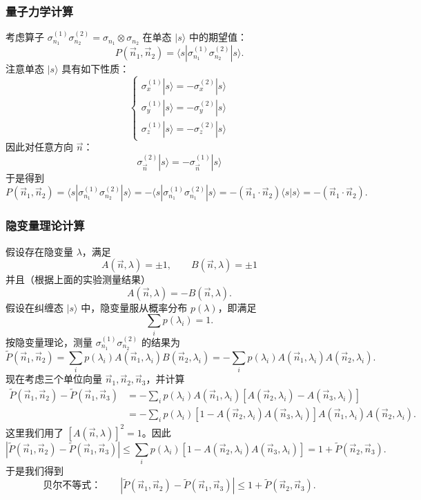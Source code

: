 \subsubsection*{量子力学计算}

考虑算子 \(\sigma_{n_1}^{(1)}\sigma_{n_2}^{(2)}=\sigma_{n_1}\otimes\sigma_{n_2}\) 在单态 \(|s\rangle\) 中的期望值：
\[
  P(\vec n_1,\vec n_2)=\langle s|\sigma_{n_1}^{(1)}\sigma_{n_2}^{(2)}|s\rangle.
\]
注意单态 \(|s\rangle\) 具有如下性质：
\[
  \begin{cases}
    \sigma_x^{(1)}|s\rangle=-\sigma_x^{(2)}|s\rangle\\[2pt]
    \sigma_y^{(1)}|s\rangle=-\sigma_y^{(2)}|s\rangle\\[2pt]
    \sigma_z^{(1)}|s\rangle=-\sigma_z^{(2)}|s\rangle
  \end{cases}
\]
因此对任意方向 \(\vec n\)：
\[
  \sigma_{\vec n}^{(2)}|s\rangle=-\sigma_{\vec n}^{(1)}|s\rangle
\]
于是得到
\[
  P(\vec n_1,\vec n_2)=\langle s|\sigma_{n_1}^{(1)}\sigma_{n_2}^{(2)}|s\rangle
  =-\langle s|\sigma_{n_1}^{(1)}\sigma_{n_1}^{(2)}|s\rangle
  =-(\vec n_1\cdot\vec n_2)\langle s|s\rangle=-(\vec n_1\cdot\vec n_2).
\]

\subsubsection*{隐变量理论计算}

假设存在隐变量 \(\lambda\)，满足
\[
  A(\vec n,\lambda)=\pm1,\qquad B(\vec n,\lambda)=\pm1
\]
并且（根据上面的实验测量结果）
\[
  A(\vec n,\lambda)=-B(\vec n,\lambda).
\]
假设在纠缠态 \(|s\rangle\) 中，隐变量服从概率分布 \(p(\lambda)\)，即满足
\[
  \sum_ip(\lambda_i)=1.
\]
按隐变量理论，测量 \(\sigma_{n_1}^{(1)}\sigma_{n_2}^{(2)}\) 的结果为
\[
  \tilde P(\vec n_1,\vec n_2)
  =\sum_ip(\lambda_i)A(\vec n_1,\lambda_i)B(\vec n_2,\lambda_i)
  =-\sum_ip(\lambda_i)A(\vec n_1,\lambda_i)A(\vec n_2,\lambda_i).
\]
现在考虑三个单位向量 \(\vec n_1,\vec n_2,\vec n_3\)，并计算
\[
  \begin{aligned}
    \tilde P(\vec n_1,\vec n_2)-\tilde P(\vec n_1,\vec n_3)
    &=-\sum_ip(\lambda_i)A(\vec n_1,\lambda_i)
      \left[A(\vec n_2,\lambda_i)-A(\vec n_3,\lambda_i)\right]\\
    &=-\sum_ip(\lambda_i)\left[1-A(\vec n_2,\lambda_i)A(\vec n_3,\lambda_i)\right]
      A(\vec n_1,\lambda_i)A(\vec n_2,\lambda_i).
  \end{aligned}
\]
这里我们用了 \(\left[A(\vec n,\lambda)\right]^2=1\)。因此
\[
  \left|\tilde P(\vec n_1,\vec n_2)-\tilde P(\vec n_1,\vec n_3)\right|
  \le\sum_ip(\lambda_i)\left[1-A(\vec n_2,\lambda_i)A(\vec n_3,\lambda_i)\right]
  =1+\tilde P(\vec n_2,\vec n_3).
\]
于是我们得到
\[
  \text{贝尔不等式：}\qquad
  \left|\tilde P(\vec n_1,\vec n_2)-\tilde P(\vec n_1,\vec n_3)\right|
  \le 1+\tilde P(\vec n_2,\vec n_3).
\]

